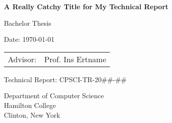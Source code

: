 \documentclass[../techreport.tex]{subfiles}
\begin{document}
\pagestyle{empty}

\begin{titlepage}

	\begin{center}\large

\vspace*{2cm}


		{\bfseries{\Large{A Really Catchy Title for My Technical Report}}}

		\vspace*{1.20cm}

		Bachelor Thesis
		\vspace*{4.0mm}

		\theauthor

		\vspace*{4.0mm}

		Date: \today 


		\vspace*{3.20cm}
		\begin{tabular}{rl}
			Advisor: & Prof. Ins Ertname\\
		\end{tabular}

		\vspace*{4mm}

        Technical Report: CPSCI-TR-20\#\#-\#\#


		\vspace*{4mm}
		Department of Computer Science \\
		Hamilton College\\
		Clinton, New York

	\end{center}

\end{titlepage}
\end{document}

